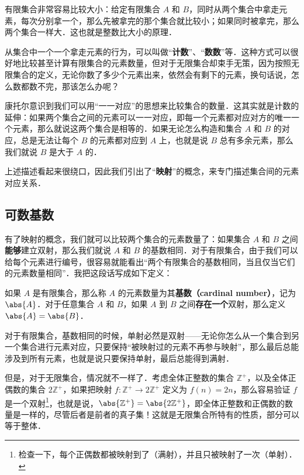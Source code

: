 有限集合非常容易比较大小：给定有限集合 $A$ 和 $B$，同时从两个集合中拿走元素，每次分别拿一个，那么先被拿完的那个集合就比较小；如果同时被拿完，那么两个集合一样大．这也就是整数比大小的原理．

从集合中一个一个拿走元素的行为，可以叫做“\textbf{计数}”、“\textbf{数数}”等．这种方式可以很好地比较甚至计算有限集合的元素数量，但对于无限集合却束手无策，因为按照无限集合的定义，无论你数了多少个元素出来，依然会有剩下的元素，换句话说，怎么数都数不完，那该怎么办呢？

康托尔意识到我们可以用“一一对应”的思想来比较集合的数量．这其实就是计数的延伸：如果两个集合之间的元素可以一一对应，即每一个元素都对应对方的唯一一个元素，那么就说这两个集合是相等的．如果无论怎么构造和集合 $A$ 和 $B$ 的对应，总是无法让每个 $B$ 的元素都对应到 $A$ 上，也就是说 $B$ 总有多余元素，那么我们就说 $B$ 是大于 $A$ 的．

上述描述看起来很绕口，因此我们引出了“\textbf{映射}”的概念，来专门描述集合间的元素对应关系．



\subsection{可数基数}


有了映射的概念，我们就可以比较两个集合的元素数量了：如果集合 $A$ 和 $B$ 之间\textbf{能够}建立双射，那么我们就说 $A$ 和 $B$ 的基数相同．对于有限集合，由于我们可以给每个元素进行编号，很容易就能看出“两个有限集合的基数相同，当且仅当它们的元素数量相同”．我把这段话写成如下定义：

\begin{definition}{}\label{CardiN_def1}
如果 $A$ 是有限集合，那么称 $A$ 的元素数量为其\textbf{基数（cardinal number）}，记为 $\abs{A}$．对于任意集合 $A$ 和 $B$，如果 $A$ 到 $B$ 之间\textbf{存在一个}双射，那么定义 $\abs{A}=\abs{B}$．
\end{definition}


对于有限集合，基数相同的时候，单射必然是双射——无论你怎么从一个集合到另一个集合进行元素对应，只要保持“被映射过的元素不再参与映射”，那么最后总能涉及到所有元素，也就是说只要保持单射，最后总能得到满射．

但是，对于无限集合，情况就不一样了．考虑全体正整数的集合 $\mathbb{Z}^+$，以及全体正偶数的集合 $2\mathbb{Z}^+$，如果把映射 $f:\mathbb{Z}^+\rightarrow2\mathbb{Z}^+$ 定义为 $f(n)=2n$，那么容易验证 $f$ 是一个双射\footnote{检查一下，每个正偶数都被映射到了（满射），并且只被映射了一次（单射）．}，也就是说，$\abs{\mathbb{Z}^+}=\abs{2\mathbb{Z}^+}$，即全体正整数和正偶数的数量是一样的，尽管后者是前者的真子集！这就是无限集合所特有的性质，部分可以等于整体．

